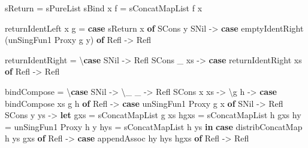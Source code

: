 \documentclass[]{article}
\newenvironment{Shaded}{}{}
\newcommand{\KeywordTok}[1]{\textcolor[rgb]{0.00,0.44,0.13}{\textbf{{#1}}}}
\newcommand{\DataTypeTok}[1]{\textcolor[rgb]{0.56,0.13,0.00}{{#1}}}
\newcommand{\OtherTok}[1]{\textcolor[rgb]{0.00,0.44,0.13}{{#1}}}
\newcommand{\FunctionTok}[1]{\textcolor[rgb]{0.02,0.16,0.49}{{#1}}}
\newcommand{\NormalTok}[1]{{#1}}
\begin{document}
\begin{Shaded}
\begin{Highlighting}[]
    \NormalTok{sReturn   }\FunctionTok{=} \NormalTok{sPureList}
    \NormalTok{sBind x f }\FunctionTok{=} \NormalTok{sConcatMapList f x}

    \NormalTok{returnIdentLeft x g }\FunctionTok{=} \KeywordTok{case} \NormalTok{sReturn x }\KeywordTok{of}
      \DataTypeTok{SCons} \NormalTok{y }\DataTypeTok{SNil} \OtherTok{->} \KeywordTok{case} \NormalTok{emptyIdentRight (unSingFun1 }\DataTypeTok{Proxy} \NormalTok{g y) }\KeywordTok{of}
        \DataTypeTok{Refl} \OtherTok{->} \DataTypeTok{Refl}

    \NormalTok{returnIdentRight }\FunctionTok{=} \NormalTok{\textbackslash{}}\KeywordTok{case}
      \DataTypeTok{SNil}       \OtherTok{->} \DataTypeTok{Refl}
      \DataTypeTok{SCons} \NormalTok{_ xs }\OtherTok{->} \KeywordTok{case} \NormalTok{returnIdentRight xs }\KeywordTok{of}
        \DataTypeTok{Refl} \OtherTok{->} \DataTypeTok{Refl}

    \NormalTok{bindCompose }\FunctionTok{=} \NormalTok{\textbackslash{}}\KeywordTok{case}
      \DataTypeTok{SNil}       \OtherTok{->} \NormalTok{\textbackslash{}_ _ }\OtherTok{->} \DataTypeTok{Refl}
      \DataTypeTok{SCons} \NormalTok{x xs }\OtherTok{->} \NormalTok{\textbackslash{}g h }\OtherTok{->} \KeywordTok{case} \NormalTok{bindCompose xs g h }\KeywordTok{of}
        \DataTypeTok{Refl} \OtherTok{->} \KeywordTok{case} \NormalTok{unSingFun1 }\DataTypeTok{Proxy} \NormalTok{g x }\KeywordTok{of}
          \DataTypeTok{SNil}       \OtherTok{->} \DataTypeTok{Refl}
          \DataTypeTok{SCons} \NormalTok{y ys }\OtherTok{->}
            \KeywordTok{let} \NormalTok{gxs  }\FunctionTok{=} \NormalTok{sConcatMapList g xs}
                \NormalTok{hgxs }\FunctionTok{=} \NormalTok{sConcatMapList h gxs}
                \NormalTok{hy   }\FunctionTok{=} \NormalTok{unSingFun1 }\DataTypeTok{Proxy} \NormalTok{h y}
                \NormalTok{hys  }\FunctionTok{=} \NormalTok{sConcatMapList h ys}
            \KeywordTok{in}  \KeywordTok{case} \NormalTok{distribConcatMap h ys gxs }\KeywordTok{of}
                  \DataTypeTok{Refl} \OtherTok{->} \KeywordTok{case} \NormalTok{appendAssoc hy hys hgxs }\KeywordTok{of}
                    \DataTypeTok{Refl} \OtherTok{->} \DataTypeTok{Refl}


\end{Highlighting}
\end{Shaded}
\end{document}
